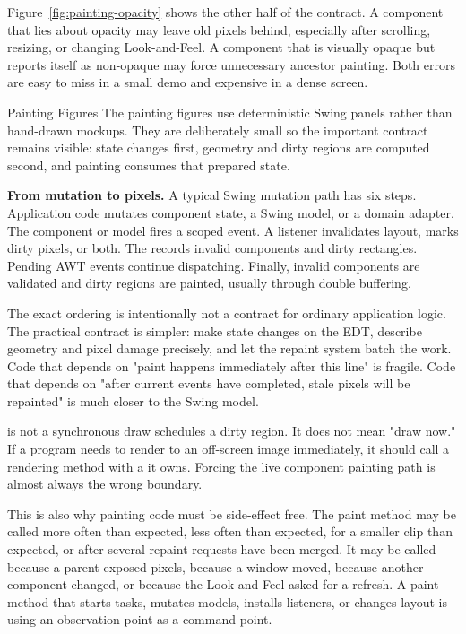 Figure~\ref{fig:painting-opacity} shows the other half of the contract. A component that lies about opacity may leave old pixels behind, especially after scrolling, resizing, or changing Look-and-Feel. A component that is visually opaque but reports itself as non-opaque may force unnecessary ancestor painting. Both errors are easy to miss in a small demo and expensive in a dense screen.

\begin{examplebox}{Painting Figures}
The painting figures use deterministic Swing panels rather than hand-drawn mockups. They are deliberately small so the important contract remains visible: state changes first, geometry and dirty regions are computed second, and painting consumes that prepared state.
\end{examplebox}

\textbf{From mutation to pixels.} A typical Swing mutation path has six steps. Application code mutates component state, a Swing model, or a domain adapter. The component or model fires a scoped event. A listener invalidates layout, marks dirty pixels, or both. The  records invalid components and dirty rectangles. Pending AWT events continue dispatching. Finally, invalid components are validated and dirty regions are painted, usually through double buffering.

The exact ordering is intentionally not a contract for ordinary application logic. The practical contract is simpler: make state changes on the EDT, describe geometry and pixel damage precisely, and let the repaint system batch the work. Code that depends on "paint happens immediately after this line" is fragile. Code that depends on "after current events have completed, stale pixels will be repainted" is much closer to the Swing model.

\begin{detailbox}{ is not a synchronous draw}
 schedules a dirty region. It does not mean "draw now." If a program needs to render to an off-screen image immediately, it should call a rendering method with a  it owns. Forcing the live component painting path is almost always the wrong boundary.
\end{detailbox}

This is also why painting code must be side-effect free. The paint method may be called more often than expected, less often than expected, for a smaller clip than expected, or after several repaint requests have been merged. It may be called because a parent exposed pixels, because a window moved, because another component changed, or because the Look-and-Feel asked for a refresh. A paint method that starts tasks, mutates models, installs listeners, or changes layout is using an observation point as a command point.

